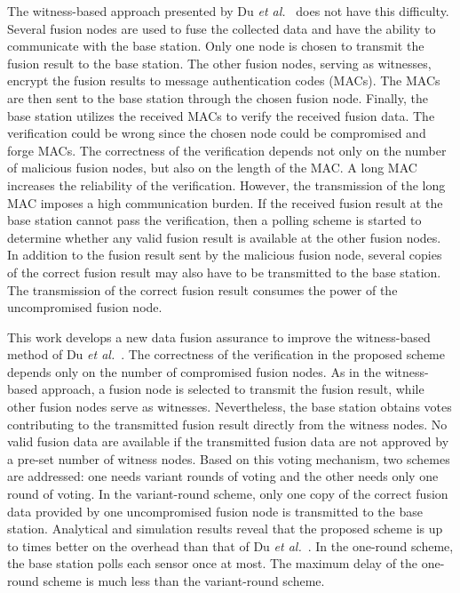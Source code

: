 \documentclass[12pt, onecolumn, draftcls]{IEEEtran}
\begin{document}
The witness-based approach presented by Du {\it et
al.}~\cite{du:assurance} does not have this difficulty. Several
fusion nodes are used to fuse the collected data and have the
ability to communicate with the base station. Only one node is
chosen to transmit the fusion result to the base station. The other
fusion nodes, serving as witnesses, encrypt the fusion results to
message authentication codes (MACs). The MACs are then sent to the
base station through the chosen fusion node. Finally, the base
station utilizes the received MACs to verify the received fusion
data. The verification could be wrong since the chosen node could be
compromised and forge MACs. The correctness of the verification
depends not only on the number of malicious fusion nodes, but also
on the length of the MAC. A long MAC increases the reliability of
the verification. However, the transmission of the long MAC imposes
a high communication burden. If the received fusion result at the
base station cannot pass the verification, then a polling scheme is
started to determine whether any valid fusion result is available at
the other fusion nodes. In addition to the fusion result sent by the
malicious fusion node, several copies of the correct fusion result
may also have to be transmitted to the base station. The
transmission of the correct fusion result consumes the power of the
uncompromised fusion node.

This work develops a new data fusion assurance to improve the
witness-based method of Du {\it et al.}~\cite{du:assurance}. The
correctness of the verification in the proposed scheme depends only
on the number of compromised fusion nodes. As in the witness-based
approach, a fusion node is selected to transmit the fusion result,
while other fusion nodes serve as witnesses. Nevertheless, the base
station obtains votes contributing to the transmitted fusion result
directly from the witness nodes. No valid fusion data are available
if the transmitted fusion data are not approved by a pre-set number
of witness nodes. Based on this voting mechanism, two schemes are
addressed: one needs variant rounds of voting and the other needs
only one round of voting. In the variant-round scheme, only one copy
of the correct fusion data provided by one uncompromised fusion node
is transmitted to the base station. Analytical and simulation
results reveal that the proposed scheme is up to  times better
on the overhead than that of Du {\it et al.}~\cite{du:assurance}. In
the one-round scheme, the base station polls each sensor once at
most. The maximum delay of the one-round scheme is much less than
the variant-round scheme.
\end{document}
